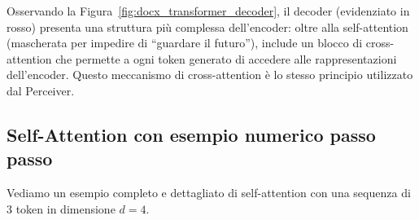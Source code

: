 \documentclass[12pt,a4paper]{article}
\begin{document}
Osservando la Figura~\ref{fig:docx_transformer_decoder}, il decoder (evidenziato in rosso) presenta una struttura pi\`u complessa dell'encoder: oltre alla self-attention (mascherata per impedire di ``guardare il futuro''), include un blocco di cross-attention che permette a ogni token generato di accedere alle rappresentazioni dell'encoder. Questo meccanismo di cross-attention \`e lo stesso principio utilizzato dal Perceiver.

\subsection{Self-Attention con esempio numerico passo passo}

Vediamo un esempio completo e dettagliato di self-attention con una sequenza di 3 token in dimensione $d = 4$.
\end{document}
